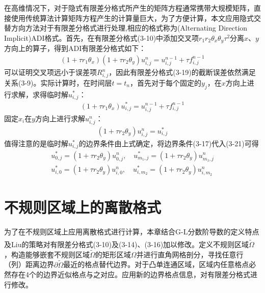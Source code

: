 \documentclass[twoside,UTF8]{nputhesis}
\newcommand{\upcite}[1]{\textsuperscript{\textsuperscript{\cite{#1}}}}
\begin{document}
在高维情况下，对于隐式有限差分格式所产生的矩阵方程通常携带大规模矩阵，直接使用传统算法计算矩阵方程产生的计算量巨大，为了方便计算，本文应用隐式交替方向方法对于有限差分格式进行处理,相应的格式称为(Alternating Direction Implicit)ADI格式。首先，在有限差分格式(3-10)中添加交叉项${{r}_{1}}{{r}_{2}}{{\theta }_{x}}{{\theta }_{y}}{{\tau }^{2}}$分离$x$、$y$方向上的算子，得到ADI有限差分格式如下：
\begin{equation}
\begin{split}
(1+\tau {{r}_{1}}{{\theta }_{x}})(1+\tau {{r}_{2}}{{\theta }_{y}})u_{i,j}^{n}=u_{i,j}^{n-1}+\tau f_{i,j}^{n-1}
\end{split}
\end{equation}
可以证明交叉项远小于误差项$R_{i,j}^{n}$，因此有限差分格式(3-19)的截断误差依然满足关系(3-9)。实际计算时，在时间层$t={{t}_{n}}$，首先对于每个固定的${{y}_{j}}$，在$x$方向上进行求解，求得临时解$u_{i,j}^{*}$：
\begin{equation}
\begin{split}
(1+\tau {{r}_{1}}{{\theta }_{x}})u_{i,j}^{\text{*}}=u_{i,j}^{n-1}+\tau f_{i,j}^{n-1}
\end{split}
\end{equation}
固定${{x}_{i}}$在$y$方向上进行求解$u_{i,j}^{n}$：
\begin{equation}
\begin{split}
(1+\tau {{r}_{2}}{{\theta }_{y}})u_{i,j}^{n}=u_{i,j}^{*}
\end{split}
\end{equation}
值得注意的是临时解$u_{i,j}^{*}$的边界条件由上式确定，将边界条件(3-17)代入(3-21)可得
\begin{equation}
\begin{split}
u_{0,j}^{*}=(1+\tau {{r}_{2}}{{\theta }_{y}})u_{0,j}^{n},\quad u_{{{m}_{1}},j}^{*}=(1+\tau {{r}_{2}}{{\theta }_{y}})u_{{{m}_{1}},j}^{n}\\
u_{i,0}^{*}=(1+\tau {{r}_{2}}{{\theta }_{y}})u_{i,0}^{n},\quad u_{i,{{m}_{2}}}^{*}=(1+\tau {{r}_{2}}{{\theta }_{y}})u_{i,{{m}_{2}}}^{n}
\end{split}
\end{equation}


\section{不规则区域上的离散格式}

为了在不规则区域上应用离散格式进行计算，本章结合G-L分数阶导数的定义特点及Liu的策略\upcite{liu2015semi}对有限差分格式(3-10)及(3-14)、(3-16)加以修改。定义不规则区域$\tilde{\Omega }$，构造能够嵌套不规则区域$\tilde{\Omega }$的矩形区域$\Omega $并进行直角网格剖分，寻找任意行（列）距离边界$\partial \tilde{\Omega} $最近的格点替代边界。对于凸单连通区域，区域内任意格点必然存在4个的边界近似格点与之对应。应用新的边界格点信息，对有限差分格式进行修改。
\end{document}
